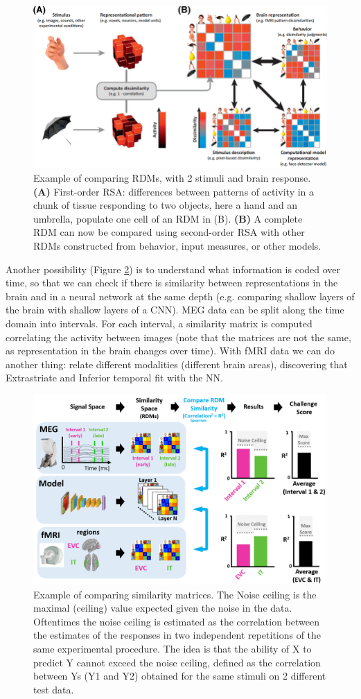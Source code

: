 \begin{figure}[!ht]
    \centering
    \captionsetup{width=.8\linewidth}
    \includegraphics[width=0.7\linewidth]{images/rsa.png}
    \caption{Example of comparing RDMs, with 2 stimuli and brain response. \textbf{(A)} First-order RSA: differences between patterns of activity in a chunk of tissue responding to two objects, here a hand and an umbrella, populate one cell of an RDM in (B). \textbf{(B)} A complete RDM can now be compared using second-order RSA with other RDMs constructed from behavior, input measures, or other models.}
    \label{fig:rsa}
\end{figure}

Another possibility (Figure \ref{fig:rsa_2}) is to understand what information is coded over time, so that we can check if there is similarity between representations in the brain and in a neural network at the same depth (e.g. comparing shallow layers of the brain with shallow layers of a CNN). MEG data can be split along the time domain into intervals. For each interval, a similarity matrix is computed correlating the activity between images (note that the matrices are not the same, as representation in the brain changes over time). With fMRI data we can do another thing: relate different modalities (different brain areas), discovering that Extrastriate and Inferior temporal fit with the NN.\\

\begin{figure}[!ht]
    \centering
    \captionsetup{width=.8\linewidth}
    \includegraphics[width=0.7\linewidth]{images/rsa_2.png}
    \caption{Example of comparing similarity matrices. The Noise ceiling is  the maximal (ceiling) value expected given the noise in the data. Oftentimes the noise ceiling is estimated as the correlation between the estimates of the responses in two independent repetitions of the same experimental procedure. The idea is that the ability of X to predict Y cannot exceed the noise ceiling, defined as the correlation between Ys (Y1 and Y2) obtained for the same stimuli on 2 different test data.}
    \label{fig:rsa_2}
\end{figure}

